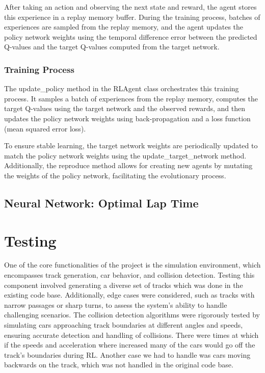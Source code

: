 \documentclass[12pt]{article}
\begin{document}
After taking an action and observing the next state and reward, the agent 
stores this experience in a replay memory buffer. During the training process, 
batches of experiences are sampled from the replay memory, and the agent 
updates the policy network weights using the temporal difference error between 
the predicted Q-values and the target Q-values computed from the target network.

\subsubsection{Training Process}
The update\_policy method in the RLAgent class orchestrates this training 
process. It samples a batch of experiences from the replay memory, computes 
the target Q-values using the target network and the observed rewards, and 
then updates the policy network weights using back-propagation and a loss 
function (mean squared error loss).

To ensure stable learning, the target network weights are periodically updated 
to match the policy network weights using the update\_target\_network method. 
Additionally, the reproduce method allows for creating new agents by mutating 
the weights of the policy network, facilitating the evolutionary process.

\subsection{Neural Network: Optimal Lap Time}

\section{Testing}

One of the core functionalities of the project is the simulation environment, 
which encompasses track generation, car behavior, and collision detection. 
Testing this component involved generating a diverse set of tracks which was 
done in the existing code base. Additionally, edge cases were considered, such 
as tracks with narrow passages or sharp turns, to assess the system's ability 
to handle challenging scenarios. The collision detection algorithms were 
rigorously tested by simulating cars approaching track boundaries at different 
angles and speeds, ensuring accurate detection and handling of collisions. There 
were times at which if the speeds and acceleration where increased many of the 
cars would go off the track's boundaries during RL. Another case we had to handle 
was cars moving backwards on the track, which was not handled in the original
code base.
\end{document}
